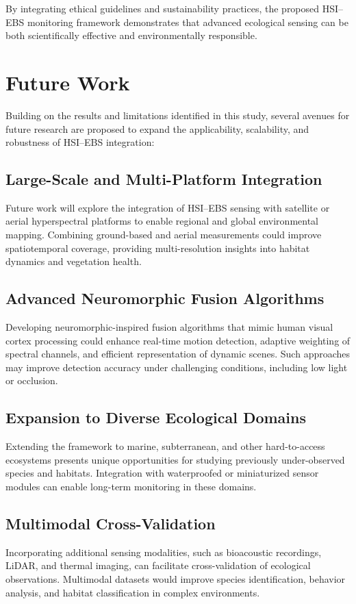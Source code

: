 \documentclass[conference]{IEEEtran}
\begin{document}
By integrating ethical guidelines and sustainability practices, the proposed HSI–EBS monitoring framework demonstrates that advanced ecological sensing can be both scientifically effective and environmentally responsible.


\section{Future Work}

Building on the results and limitations identified in this study, several avenues for future research are proposed to expand the applicability, scalability, and robustness of HSI–EBS integration:

\subsection{Large-Scale and Multi-Platform Integration}
Future work will explore the integration of HSI–EBS sensing with satellite or aerial hyperspectral platforms to enable regional and global environmental mapping. Combining ground-based and aerial measurements could improve spatiotemporal coverage, providing multi-resolution insights into habitat dynamics and vegetation health.

\subsection{Advanced Neuromorphic Fusion Algorithms}
Developing neuromorphic-inspired fusion algorithms that mimic human visual cortex processing could enhance real-time motion detection, adaptive weighting of spectral channels, and efficient representation of dynamic scenes. Such approaches may improve detection accuracy under challenging conditions, including low light or occlusion.

\subsection{Expansion to Diverse Ecological Domains}
Extending the framework to marine, subterranean, and other hard-to-access ecosystems presents unique opportunities for studying previously under-observed species and habitats. Integration with waterproofed or miniaturized sensor modules can enable long-term monitoring in these domains.

\subsection{Multimodal Cross-Validation}
Incorporating additional sensing modalities, such as bioacoustic recordings, LiDAR, and thermal imaging, can facilitate cross-validation of ecological observations. Multimodal datasets would improve species identification, behavior analysis, and habitat classification in complex environments.
\end{document}
